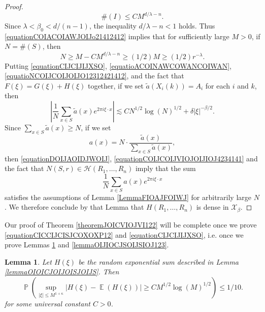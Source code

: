 \documentclass[dvipsnames,letterpaper,12pt]{article}
\numberwithin{equation}{section}
\newtheorem{lemma}[theorem]{Lemma}
\numberwithin{theorem}{section}
\DeclareMathOperator{\EE}{\mathbb{E}}
\DeclareMathOperator{\PP}{\mathbb{P}}
\begin{document}
\begin{proof}
\begin{equation}
        \#(I) \leq C M^{d/\lambda - n}.
    \end{equation}
    Since $\lambda < \beta_0 < d/(n-1)$, the inequality $d/\lambda - n < 1$ holds. Thus \eqref{equationCOIACOIAWJOIJo21412412} implies that for sufficiently large $M > 0$, if $N = \#(S)$, then
    \begin{equation} \label{equationCOIJCOIJVIOJOIJIOJ4234141}
        N \geq M - C M^{d/\lambda - n} \geq (1/2) M \geq (1/2) r^{-\lambda}.
    \end{equation}
    Putting \eqref{equationCIJCIJIJXSO}, \eqref{equatioACOINAWCOWANCOIWAN}, \eqref{equatioNCOIJCOIJOIJO12312421412}, and the fact that $F(\xi) = G(\xi) + H(\xi)$ together, if we set $\tilde{a}(X_i(k)) = A_i$ for each $i$ and $k$, then
    \begin{equation} \label{equationDOIJAOIDJWOIJ}
        \left| \frac{1}{N} \sum_{x \in S} \tilde{a}(x) e^{2 \pi i \xi \cdot x} \right| \lesssim C N^{1/2} \log(N)^{1/2} + \delta |\xi|^{-\beta/2}.
    \end{equation}
    Since $\sum_{x \in S} \tilde{a}(x) \geq N$, if we set
    \[ a(x) = N \cdot \frac{\tilde{a}(x)}{\sum_{x \in S} \tilde{a}(x)}, \]
    then \eqref{equationDOIJAOIDJWOIJ}, \eqref{equationCOIJCOIJVIOJOIJIOJ4234141} and the fact that $N(S,r) \in \mathcal{H}(R_1,\dots,R_n)$ imply that the sum
    \[ \frac{1}{N} \sum_{x \in S} a(x) e^{2 \pi i \xi \cdot x} \]
    satisfies the assumptions of Lemma \ref{LemmaFIOAJFOIWJ} for arbitrarily large $N$. We therefore conclude by that Lemma that $H(R_1,\dots,R_n)$ is dense in $\mathcal{X}_\beta$.
\end{proof}

Our proof of Theorem \ref{theoremJOICVIOJVI122} will be complete once we prove \eqref{equationCICCIJCISJCOXOXP12} and \eqref{equationCIJCIJIJXSO}, i.e. once we prove Lemmas \ref{lemma24901401921209} and \ref{lemmaOIJIOCJSOIJSIOJ123}.

\begin{lemma} \label{lemma24901401921209}
    Let $H(\xi)$ be the random exponential sum described in Lemma \ref{lemmaOIOICJOIJOISJOIJS}. Then
    \[ \PP \left( \sup_{|\xi| \leq M^{1 + \kappa}} | H(\xi) - \EE(H(\xi)) | \geq C M^{1/2} \log(M)^{1/2} \right) \leq 1/10. \]
    for some universal constant $C > 0$.
\end{lemma}

\end{document}
